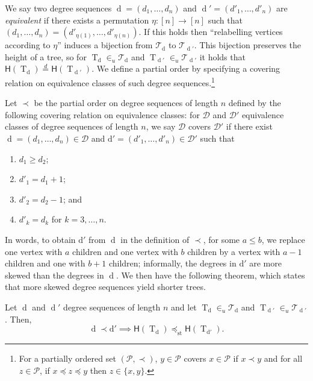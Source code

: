 \documentclass[AHL,Unicode,longabstracts,published]{cedram}
\newcommand{\height}{\mathsf{H}}
\newcommand{\sequence}[1]{\mathrm{#1}}
\DeclareMathOperator{\rtree}{T}
\DeclareMathOperator{\dseq}{d}
\DeclareMathOperator{\st}{st}
\newcommand\cD{\mathcal{D}}
\newcommand\cT{\mathcal{T}}
\newcommand{\clP}{\mathcal{P}}
\begin{document}
{We say two degree sequences $\dseq=(d_1,\dots,d_n)$ and $\dseq'=(d'_1,\dots,d'_n)$ are \emph{equivalent} if there exists a permutation $\eta:[n]\to [n]$ such that $(d_1,\dots,d_n)=(d'_{\eta(1)},\dots,d'_{\eta(n)})$. If this holds then ``relabelling vertices according to $\eta$'' induces a bijection from $\cT_{\dseq}$ to $\cT_{\dseq'}$. This bijection preserves the height of a tree, so for $\rtree_{\dseq}\in_u\cT_{\dseq}$ and $\rtree_{\dseq'}\in_u\cT_{\dseq'}$ it holds that $\height(\rtree_{\dseq})\overset{d}{=}\height(\rtree_{\dseq'})$. We define a partial order by specifying a covering relation on equivalence classes of such degree sequences.\footnote{For a partially ordered set $(\clP,\prec)$, $y \in\clP$ covers $x \in \clP$ if $x \prec y$ and for all $z \in \clP$, if $x \preceq z \preceq y$ then $z \in \{x,y\}$.}

Let $\prec$ be the partial order on degree sequences of length $n$ defined by the following covering relation on equivalence classes: for $\cD$ and $\cD'$ equivalence classes of degree sequences of length $n$, we say $\cD$ covers $\cD'$ if there exist $\dseq=(d_1,\dots,d_n)\in \cD$ and $\sequence{d'}=(d'_1,\dots,d'_n)\in \cD'$ such that
\begin{enumerate}
\item $d_1\geq d_2$;
\item $d'_1=d_1+1$;
\item $d'_2=d_2-1$; and
\item $d'_k=d_k$ for $k=3,\dots,n$.
\end{enumerate}

In words, to obtain $\sequence{d'}$ from $\dseq$ in the definition of $\prec$, for some $a\leq b$, we replace one vertex with $a$ children and one vertex with $b$ children by a vertex with $a-1$ children and one with $b+1$ children; informally, the degrees in $\sequence{d'} $ are more skewed than the degrees in $\dseq$. We then have the following theorem, which states that more skewed degree sequences yield shorter trees.}



\begin{theo}[{\cite[Theorem~9]{AD22}}]\label{thm:stochastic_order}
Let $\dseq$ and $\dseq'$ degree sequences of length $n$ and let $\rtree_{\dseq} \in_u \cT_{\dseq}$ and $\rtree_{\dseq'}\in_u \cT_{\dseq'}$. Then,
\[
\dseq \prec \sequence{d'} \implies \height(\rtree_{\dseq})\preceq_{\st} \height(\rtree_{\sequence{d'}}).
\]
\end{theo}
\end{document}
